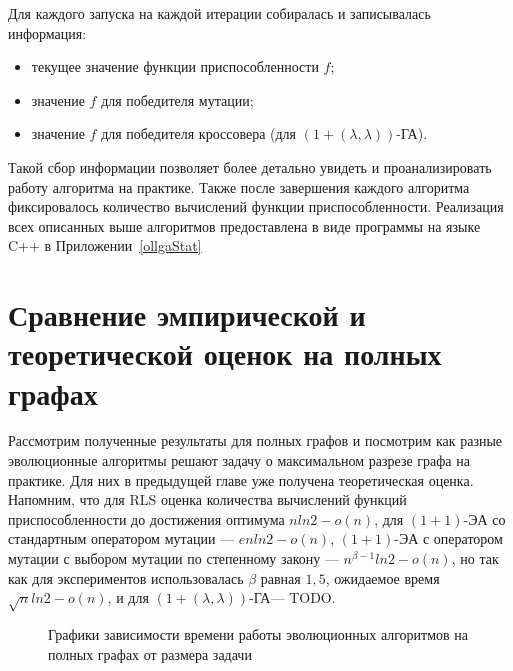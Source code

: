 \documentclass[times]{itmo-student-thesis}
\newcommand{\alglambdaf}{${(1 + (\lambda , \lambda))}$-ГА\xspace}
\newcommand{\oea}{\mbox{$(1 + 1)$-ЭА}\xspace}
\begin{document}
Для каждого запуска на каждой итерации собиралась и записывалась  информация:
\begin{itemize}
 \item текущее значение функции приспособленности $f$;
 \item значение $f$ для победителя мутации;
 \item значение $f$ для победителя кроссовера (для \alglambdaf).
\end{itemize}

Такой сбор информации позволяет более детально увидеть и проанализировать работу алгоритма на практике.
Также после завершения каждого алгоритма фиксировалось количество вычислений функции приспособленности.
Реализация всех описанных выше алгоритмов предоставлена в виде программы на языке C++ в Приложении~\ref{ollgaStat}

\section{Сравнение эмпирической и теоретической оценок на полных графах}

Рассмотрим полученные результаты для полных графов и посмотрим как разные эволюционные алгоритмы решают задачу о максимальном разрезе графа на практике.
Для них в предыдущей главе уже получена теоретическая оценка.
Напомним, что для RLS оценка количества вычислений функций приспособленности до достижения оптимума $nln2 - o(n)$, для \oea со стандартным оператором мутации --- $enln2 - o(n)$, \oea с оператором мутации с выбором мутации по степенному закону --- $n^{\beta-1}ln2 - o(n)$, но так как для экспериментов использовалась $\beta$ равная $1,5$, ожидаемое время $\sqrt{n}ln2 - o(n)$, и для \alglambdaf --- TODO.

\begin{figure}[t!]
\caption{Графики зависимости времени работы эволюционных алгоритмов на полных графах от размера задачи}
\label{fig:kn}
\end{figure}
\end{document}
